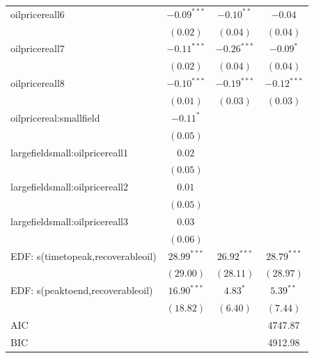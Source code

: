 \documentclass[12pt]{article}
\begin{document}
\begin{table}
\begin{center}
\begin{tabular}{l c c c }
oilpricereall6                    & $-0.09^{***}$   & $-0.10^{**}$   & $-0.04$         \\
                                     & $(0.02)$        & $(0.04)$       & $(0.04)$        \\
oilpricereall7                    & $-0.11^{***}$   & $-0.26^{***}$  & $-0.09^{*}$     \\
                                     & $(0.02)$        & $(0.04)$       & $(0.04)$        \\
oilpricereall8                    & $-0.10^{***}$   & $-0.19^{***}$  & $-0.12^{***}$   \\
                                     & $(0.01)$        & $(0.03)$       & $(0.03)$        \\
oilpricereal:smallfield      & $-0.11^{*}$     &                &                 \\
                                     & $(0.05)$        &                &                 \\
largefieldsmall:oilpricereall1   & $0.02$          &                &                 \\
                                     & $(0.05)$        &                &                 \\
largefieldsmall:oilpricereall2   & $0.01$          &                &                 \\
                                     & $(0.05)$        &                &                 \\
largefieldsmall:oilpricereall3   & $0.03$          &                &                 \\
                                     & $(0.06)$        &                &                 \\
EDF: s(timetopeak,recoverableoil) & $28.99^{***}$   & $26.92^{***}$  & $28.79^{***}$   \\
                                     & $(29.00)$       & $(28.11)$      & $(28.97)$       \\
EDF: s(peaktoend,recoverableoil)  & $16.90^{***}$   & $4.83^{*}$     & $5.39^{**}$     \\
                                     & $(18.82)$       & $(6.40)$       & $(7.44)$        \\
\hline
AIC                                  &                 &                & 4747.87         \\
BIC                                  &                 &                & 4912.98         \\

\end{tabular}
\end{center}
\end{table}
\end{document}
